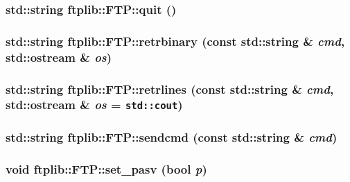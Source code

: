 \hypertarget{classftplib_1_1FTP_bd6e018a5cc17b1c8007064830823c71}{
\subsubsection[{quit}]{\setlength{\rightskip}{0pt plus 5cm}std::string ftplib::FTP::quit ()}}
\label{classftplib_1_1FTP_bd6e018a5cc17b1c8007064830823c71}


\hypertarget{classftplib_1_1FTP_ad060fdb45fec7ccd5949e475df96982}{
\subsubsection[{retrbinary}]{\setlength{\rightskip}{0pt plus 5cm}std::string ftplib::FTP::retrbinary (const std::string \& {\em cmd}, \/  std::ostream \& {\em os})}}
\label{classftplib_1_1FTP_ad060fdb45fec7ccd5949e475df96982}


\hypertarget{classftplib_1_1FTP_b04e374d4835e124959cee085df3fa4e}{
\subsubsection[{retrlines}]{\setlength{\rightskip}{0pt plus 5cm}std::string ftplib::FTP::retrlines (const std::string \& {\em cmd}, \/  std::ostream \& {\em os} = {\tt std::cout})}}
\label{classftplib_1_1FTP_b04e374d4835e124959cee085df3fa4e}


\hypertarget{classftplib_1_1FTP_5a876d670107df4b5924238450440eee}{
\subsubsection[{sendcmd}]{\setlength{\rightskip}{0pt plus 5cm}std::string ftplib::FTP::sendcmd (const std::string \& {\em cmd})}}
\label{classftplib_1_1FTP_5a876d670107df4b5924238450440eee}


\hypertarget{classftplib_1_1FTP_e35230239f093f01fb295ccb007de1b2}{
\subsubsection[{set\_\-pasv}]{\setlength{\rightskip}{0pt plus 5cm}void ftplib::FTP::set\_\-pasv (bool {\em p})}}
\label{classftplib_1_1FTP_e35230239f093f01fb295ccb007de1b2}


